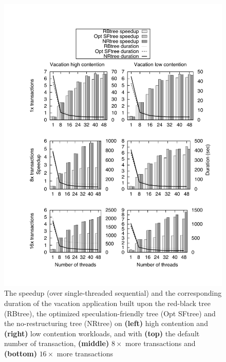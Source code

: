\begin{figure}[t]	
	\begin{center}
	\includegraphics[scale=0.4,clip=true,viewport=49 5 580 750]{Tree/fig/vacation/vacation_avg2}
	\caption{The speedup (over single-threaded sequential) and the corresponding duration of the vacation application built upon the red-black tree (RBtree), the optimized speculation-friendly tree (Opt SFtree) and the no-restructuring tree (NRtree) on  {\bf (left)} high contention and  {\bf (right)} low contention workloads, and with  {\bf (top)} the default number of transaction,  {\bf (middle)} $8\times$ more transactions and {\bf (bottom)} $16\times$ more transactions\label{fig:vacation-threads}}	
	\end{center}
\end{figure}


